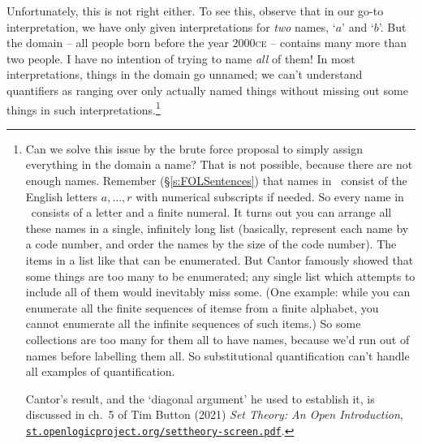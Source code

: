 Unfortunately, this is not right either. To see this, observe that in our go-to interpretation, we have only given interpretations for \emph{two} names, `$a$' and `$b$'. But the domain – all people born before the year 2000\textsc{ce} – contains many more than two people. I have no intention of trying to name \emph{all} of them!  In most interpretations, things in the domain go unnamed; we can't understand quantifiers as ranging over only actually named things without missing out some things in such interpretations.\footnote{Can we solve this issue by the brute force proposal to simply assign everything in the domain a name? That is not possible, because there are not enough names. Remember (§\ref{s:FOLSentences}) that names in \FOL\ consist of the English letters $a,…,r$ with numerical subscripts if needed. So every name in \FOL\ consists of a letter and a finite numeral. It turns out you can arrange all these names in a single, infinitely long list (basically, represent each name by a code number, and order the names by the size of the code number). The items in a list like that can be enumerated. But Cantor famously showed that some things are too many to be enumerated; any single list which attempts to include all of them would inevitably miss some. (One example: while you can enumerate all the finite sequences of itemse from a finite alphabet, you cannot enumerate all the infinite sequences of such items.) So some collections are too many for them all to have names, because we'd run out of names before labelling them all. So substitutional quantification can't handle all examples of quantification.

Cantor's result, and the `diagonal argument' he used to establish it, is discussed in ch.~5 of Tim Button (2021) \emph{Set Theory: An Open Introduction}, \href{https://st.openlogicproject.org/settheory-screen.pdf}{\nolinkurl{st.openlogicproject.org/settheory-screen.pdf}}.}


